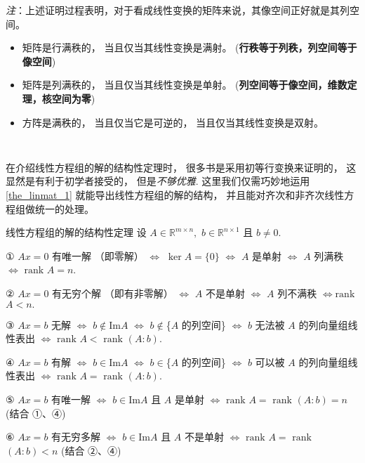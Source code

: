 \textsl{注}：上述证明过程表明，对于看成线性变换的矩阵来说，其像空间正好就是其列空间。 

\begin{itemize}
\item 矩阵是行满秩的， 当且仅当其线性变换是满射。 (\textbf{行秩等于列秩，列空间等于像空间})
\end{itemize}

\begin{itemize}
\item 矩阵是列满秩的， 当且仅当其线性变换是单射。 (\textbf{列空间等于像空间，维数定理，核空间为零})
\end{itemize}

\begin{itemize}
\item 方阵是满秩的， 当且仅当它是可逆的， 当且仅当其线性变换是双射。 \end{itemize}
\verb| |

在介绍线性方程组的解的结构性定理时， 很多书是采用初等行变换来证明的， 这显然是有利于初学者接受的， 但是\textsl{不够优雅}. 这里我们仅需巧妙地运用 \autoref{the_linmat_1} 就能导出线性方程组的解的结构，
并且能对齐次和非齐次线性方程组做统一的处理。 

\begin{theorem}{线性方程组的解的结构性定理}\label{the_linmat_2}
设 $A\in\mathbb{R}^{m\times n},$ $b\in\mathbb{R}^{n\times1}$ 且 $b\neq0$.

① $Ax=0$ 有唯一解 （即零解） $\Leftrightarrow$ $\ker A=\{0\}$ $\Leftrightarrow$
$A$ 是单射 $\Leftrightarrow$ $A$ 列满秩 $\Leftrightarrow$ $\mathrm{rank}$
$A=n.$ 

② $Ax=0$ 有无穷个解 （即有非零解） $\Leftrightarrow$ $A$ 不是单射 $\Leftrightarrow$
$A$ 列不满秩 $\Leftrightarrow\mathrm{rank}$ $A<n.$ 

③ $Ax=b$ 无解 $\Leftrightarrow$ $b\notin\mathrm{Im}A$ $\Leftrightarrow$
$b\notin$\{$A$ 的列空间\} $\Leftrightarrow$ $b$ 无法被 $A$ 的列向量组线性表出
$\Leftrightarrow$ $\mathrm{rank}$ $A<$ $\mathrm{rank}$ $(A:b).$

④ $Ax=b$ 有解 $\Leftrightarrow$ $b\in\mathrm{Im}A$ $\Leftrightarrow$
$b\in$\{$A$ 的列空间\} $\Leftrightarrow$ $b$ 可以被 $A$ 的列向量组线性表出 $\Leftrightarrow$
$\mathrm{rank}$ $A=$ $\mathrm{rank}$ $(A:b).$

⑤ $Ax=b$ 有唯一解 $\Leftrightarrow$ $b\in\mathrm{Im}A$ 且 $A$ 是单射 $\Leftrightarrow$
$\mathrm{rank}$ $A=$ $\mathrm{rank}$ $(A:b)=n$ (结合 ①、④)

⑥ $Ax=b$ 有无穷多解 $\Leftrightarrow$ $b\in\mathrm{Im}A$ 且 $A$ 不是单射
$\Leftrightarrow$ $\mathrm{rank}$ $A=$ $\mathrm{rank}$ $(A:b)<n$
(结合 ②、④)
\end{theorem}


